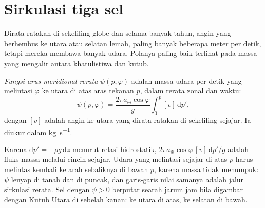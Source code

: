 \section{Sirkulasi tiga sel}\label{sec:b1:atmospheric-circulation:cells}

Dirata-ratakan di sekeliling globe dan selama banyak tahun, angin yang berhembus ke utara atau selatan lemah, paling banyak beberapa meter per detik, tetapi mereka membawa banyak udara. Polanya paling baik terlihat pada massa yang mengalir antara khatulistiwa dan kutub.

\begin{definition}\label{def:b1:atmospheric-circulation:streamfunction}
\emph{Fungsi arus meridional rerata}
$\psi(p, \varphi)$ adalah massa udara per detik yang melintasi 
$\varphi$ ke utara di atas aras tekanan $p$, dalam rerata zonal dan waktu:
\[
  \psi(p, \varphi) = \frac{2\pi a_\oplus\cos\varphi}{g}\int_0^p [v]\,\mathrm dp' ,
\]
dengan $[v]$ adalah angin ke utara yang dirata-ratakan di sekeliling sejajar. Ia diukur dalam
\unit{kg.s^{-1}}.
\end{definition}

Karena $\mathrm dp' = -\rho g\,\mathrm dz$ menurut relasi hidrostatik, $2\pi a_\oplus
\cos\varphi\,[v]\,\mathrm dp'/g$ adalah fluks massa melalui cincin sejajar. Udara yang melintasi sejajar di atas $p$ harus melintas kembali ke arah sebaliknya di bawah $p$, karena massa tidak menumpuk: $\psi$ lenyap di tanah dan di puncak, dan garis-garis nilai samanya adalah jalur sirkulasi rerata. Sel dengan $\psi > 0$ berputar searah jarum jam bila digambar dengan Kutub Utara di sebelah kanan: ke utara di atas, ke selatan di bawah.

